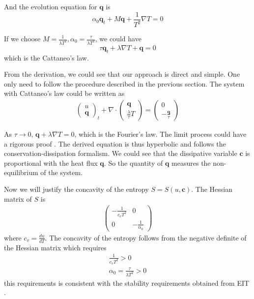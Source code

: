 \documentclass[a4paper]{article}
\begin{document}
And the evolution equation for $\mathbf{q}$ is
\begin{equation}
{\alpha_0}\mathbf{q}_t + M \mathbf{q} + \frac{1}{T^2} \nabla T=0
\end{equation}

If we choose $M=\frac{1}{\lambda T^2},\alpha_0=\frac{\tau}{\lambda T^2}$, we could have 
\begin{equation}
\tau \mathbf{q}_t + \lambda \nabla T+\mathbf{q}=0
\end{equation}
which is the Cattaneo's law.

From the derivation, we could see that our approach is direct and simple. One only need to follow the procedure described in the previous section. The system with Cattaneo's law could be written as
\begin{eqnarray}
\left( \begin{array}{ll} u \\ \mathbf{q} \end{array} \right)_t + \nabla \cdot \left( \begin{array}{ll} \mathbf{q} \\ \frac{\lambda}{\tau} T \end{array} \right) =\left( \begin{array}{ll} 0 \\ -\frac{\mathbf{q}}{\tau} \end{array} \right) 
\end{eqnarray}

As $\tau \rightarrow 0$, $\mathbf{q}+\lambda \nabla T=0$, which is the Fourier's law. The limit process could have a rigorous proof \cite{yong2008interesting}.
The derived equation is thus hyperbolic and follows the conservation-dissipation formalism. We could see that the dissipative variable $\mathbf{c}$ is proportional with the heat flux $\mathbf{q}$. So the quantity of  $\mathbf{q}$ measures the non-equilibrium of the system.

Now we will justify the concavity of the entropy $S=S(u,\mathbf{c})$. The Hessian matrix of $S$ is
\begin{eqnarray}
\left( \begin{array}{ll} -\frac{1}{c_v T^2} & 0 \\ 0 & -\frac{1}{\alpha_0} \end{array} \right)
\end{eqnarray}
where $c_v=\frac{d u}{d T}$.
The concavity of the entropy follows from the negative definite of the Hessian matrix which requires 
\begin{eqnarray}
\frac{1}{c_v T^2}>0 \\
\alpha_0=\frac{\tau}{\lambda T^2}>0
\end{eqnarray}
this requirements is consistent with the stability requirements obtained from EIT \cite{Jou1996extended}.
\end{document}
